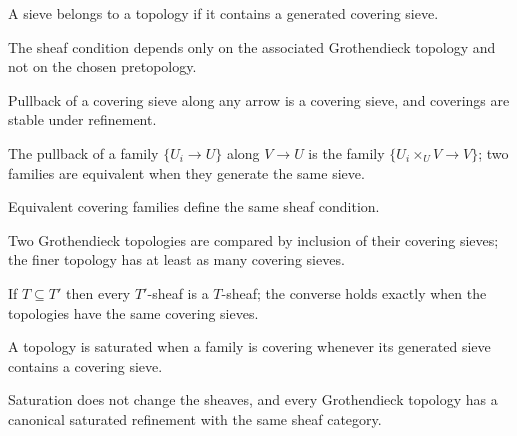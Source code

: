\begin{definition}\label{fga-def-2-41}
A sieve belongs to a topology if it contains a generated covering sieve.
\end{definition}
\begin{proposition}\label{fga-prop-2-42}
The sheaf condition depends only on the associated Grothendieck topology and
not on the chosen pretopology.
\end{proposition}
\begin{proposition}\label{fga-prop-2-44}
Pullback of a covering sieve along any arrow is a covering sieve, and coverings
are stable under refinement.
\end{proposition}
\begin{definition}\label{fga-def-2-45}
The pullback of a family $\{U_i\to U\}$ along $V\to U$ is the family
$\{U_i\times_UV\to V\}$; two families are equivalent when they generate the
same sieve.
\end{definition}
\begin{proposition}\label{fga-prop-2-46}
Equivalent covering families define the same sheaf condition.
\end{proposition}
\begin{definition}\label{fga-def-2-47}
Two Grothendieck topologies are compared by inclusion of their covering sieves;
the finer topology has at least as many covering sieves.
\end{definition}
\begin{proposition}\label{fga-prop-2-48}
If $T\subseteq T'$ then every $T'$-sheaf is a $T$-sheaf; the converse holds
exactly when the topologies have the same covering sieves.
\end{proposition}
\begin{definition}\label{fga-def-2-52}
A topology is saturated when a family is covering whenever its generated sieve
contains a covering sieve.
\end{definition}
\begin{proposition}\label{fga-prop-2-53}
Saturation does not change the sheaves, and every Grothendieck topology has a
canonical saturated refinement with the same sheaf category.
\end{proposition}
